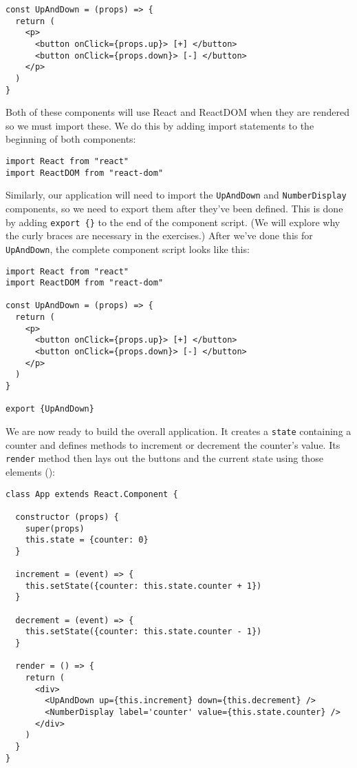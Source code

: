 \begin{verbatim}
const UpAndDown = (props) => {
  return (
    <p>
      <button onClick={props.up}> [+] </button>
      <button onClick={props.down}> [-] </button>
    </p>
  )
}
\end{verbatim}

Both of these components will use React and ReactDOM when they are rendered
so we must import these.
We do this by adding import statements to the beginning of both components:

\begin{verbatim}
import React from "react"
import ReactDOM from "react-dom"
\end{verbatim}

Similarly, our application will need to import the
\texttt{UpAndDown} and \texttt{NumberDisplay} components,
so we need to export them after they've been defined.
This is done by adding \texttt{export\ \{\}} to the end of the
component script.
(We will explore why the curly braces are necessary in the exercises.)
After we've done this for \texttt{UpAndDown},
the complete component script looks like this:

\begin{verbatim}
import React from "react"
import ReactDOM from "react-dom"

const UpAndDown = (props) => {
  return (
    <p>
      <button onClick={props.up}> [+] </button>
      <button onClick={props.down}> [-] </button>
    </p>
  )
}

export {UpAndDown}
\end{verbatim}

We are now ready to build the overall application.
It creates a \texttt{state} containing a counter
and defines methods to increment or decrement the counter's value.
Its \texttt{render} method then lays out the buttons and the current state
using those elements
():

\begin{verbatim}
class App extends React.Component {

  constructor (props) {
    super(props)
    this.state = {counter: 0}
  }

  increment = (event) => {
    this.setState({counter: this.state.counter + 1})
  }

  decrement = (event) => {
    this.setState({counter: this.state.counter - 1})
  }

  render = () => {
    return (
      <div>
        <UpAndDown up={this.increment} down={this.decrement} />
        <NumberDisplay label='counter' value={this.state.counter} />
      </div>
    )
  }
}
\end{verbatim}

